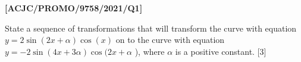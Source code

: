 \item \textbf{{[}ACJC/PROMO/9758/2021/Q1{]} }

State a sequence of transformations that will transform the curve
with equation $y=2\sin(2x+\alpha)\cos(x)$ on to the curve with equation
$y=-2\sin(4x+3\alpha)\cos(2x+\alpha$ ), where $\alpha$ is a positive
constant. \hfill{}{[}3{]}